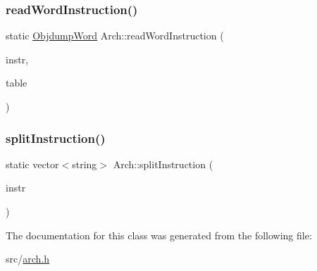 \mbox{\label{classArch_ae31c680981598a1b57f5f0cddd211e9d}} 
\subsubsection{\texorpdfstring{read\+Word\+Instruction()}{readWordInstruction()}}
{\footnotesize\ttfamily static \hyperlink{classObjdumpWord}{Objdump\+Word} Arch\+::read\+Word\+Instruction (\begin{DoxyParamCaption}\item[{const \hyperlink{classObjdumpInstruction}{Objdump\+Instruction} \&}]{instr,  }\item[{\hyperlink{classObjdumpSymbolTable}{Objdump\+Symbol\+Table} \&}]{table }\end{DoxyParamCaption})\hspace{0.3cm}{\ttfamily [static]}}

\mbox{\label{classArch_a02fb24c4a3666859e5d503b370f980ec}} 
\subsubsection{\texorpdfstring{split\+Instruction()}{splitInstruction()}}
{\footnotesize\ttfamily static vector$<$string$>$ Arch\+::split\+Instruction (\begin{DoxyParamCaption}\item[{const string \&}]{instr }\end{DoxyParamCaption})\hspace{0.3cm}{\ttfamily [static]}}



The documentation for this class was generated from the following file\+:\begin{DoxyCompactItemize}
\item 
src/\hyperlink{arch_8h}{arch.\+h}\end{DoxyCompactItemize}
